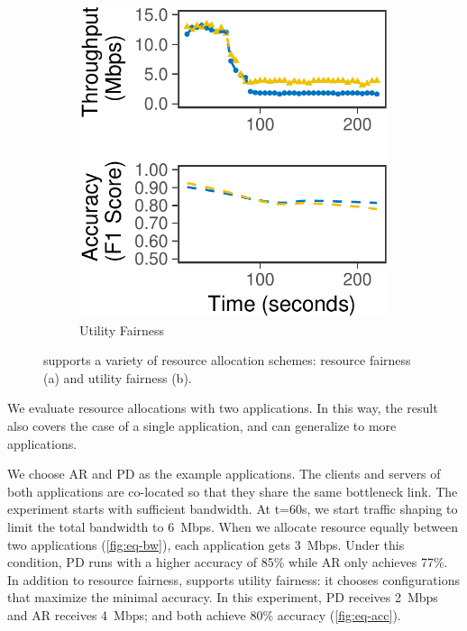 \begin{figure}
\begin{subfigure}[t]{0.45\columnwidth}
    \includegraphics[width=\textwidth]{figures/multitask-right.pdf}
    \caption{Utility Fairness}
    \label{fig:eq-acc}
  \end{subfigure}
  \caption{\sysname{} supports a variety of resource allocation schemes:
    resource fairness (a) and utility fairness (b).}
  \label{fig:multitask}
  \vspace{-1em}
\end{figure}

We evaluate resource allocations with two applications. In this way, the result
also covers the case of a single application, and can generalize to more
applications.

We choose AR and PD as the example applications.  The clients and servers of
both applications are co-located so that they share the same bottleneck
link. The experiment starts with sufficient bandwidth. At t=60s, we start
traffic shaping to limit the total bandwidth to \SI{6}{Mbps}. When we allocate
resource equally between two applications (\autoref{fig:eq-bw}), each
application gets \SI{3}{Mbps}. Under this condition, PD runs with a higher
accuracy of 85\% while AR only achieves 77\%. In addition to resource fairness,
\sysname{} supports utility fairness: it chooses configurations that maximize
the minimal accuracy. In this experiment, PD receives \SI{2}{Mbps} and AR
receives \SI{4}{Mbps}; and both achieve 80\% accuracy (\autoref{fig:eq-acc}).


